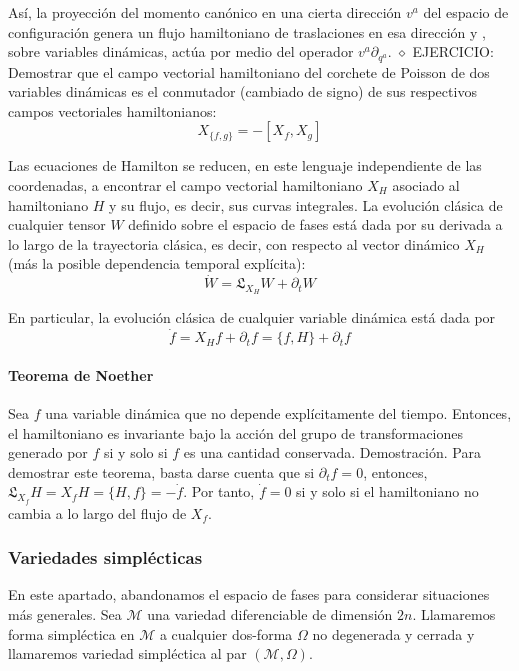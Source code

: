 Así, la proyección del momento canónico en una cierta dirección $v^{a}$ del espacio de configuración genera un flujo hamiltoniano de traslaciones en esa dirección y , sobre variables dinámicas, actúa por medio del operador $v^{a} \partial_{q^{a}}$.
$\diamond$ EJERCICIO: Demostrar que el campo vectorial hamiltoniano del corchete de Poisson de dos variables dinámicas es el conmutador (cambiado de signo) de sus respectivos campos vectoriales hamiltonianos:
$$
X_{\{f, g\}}=-\left[X_{f}, X_{g}\right]
$$


Las ecuaciones de Hamilton se reducen, en este lenguaje independiente de las coordenadas, a encontrar el campo vectorial hamiltoniano $X_{H}$ asociado al hamiltoniano $H$ y su flujo, es decir, sus curvas integrales. La evolución clásica de cualquier tensor $W$ definido sobre el espacio de fases está dada por su derivada a lo largo de la trayectoria clásica, es decir, con respecto al vector dinámico $X_{H}$ (más la posible dependencia temporal explícita):
$$
\dot{W}=\mathfrak{L}_{X_{H}} W+\partial_{t} W
$$

En particular, la evolución clásica de cualquier variable dinámica está dada por
$$
\dot{f}=X_{H} f+\partial_{t} f=\{f, H\}+\partial_{t} f
$$

\paragraph{Teorema de Noether}
Sea $f$ una variable dinámica que no depende explícitamente del tiempo. Entonces, el hamiltoniano es invariante bajo la acción del grupo de transformaciones generado por $f$ si y solo si $f$ es una cantidad conservada.
Demostración. Para demostrar este teorema, basta darse cuenta que si $\partial_{t} f=0$, entonces, $\mathfrak{L}_{X_{f}} H=X_{f} H=\{H, f\}=-\dot{f}$. Por tanto, $\dot{f}=0$ si y solo si el hamiltoniano no cambia a lo largo del flujo de $X_{f}$.
\subsubsection{Variedades simplécticas}
En este apartado, abandonamos el espacio de fases para considerar situaciones más generales. Sea $\mathscr{M}$ una variedad diferenciable de dimensión $2 n$. Llamaremos forma simpléctica en $\mathscr{M}$ a cualquier dos-forma $\Omega$ no degenerada y cerrada y llamaremos variedad simpléctica al par $(\mathscr{M}, \Omega)$.

